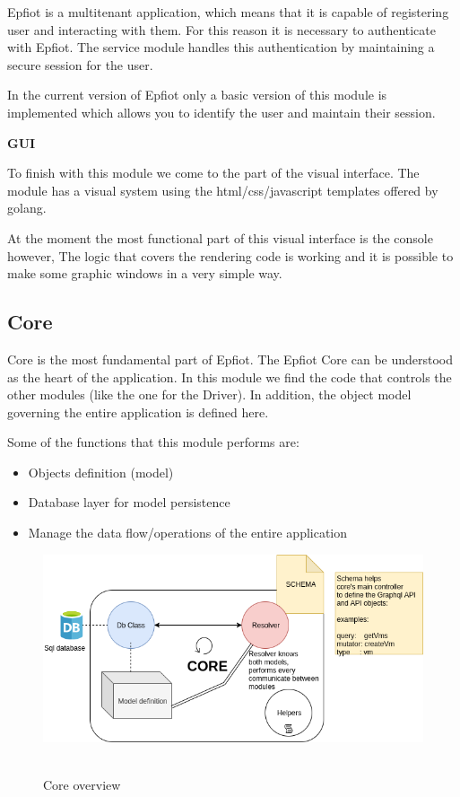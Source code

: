 Epfiot is a multitenant application, which means that it is capable of registering user and interacting with them. For this reason it is necessary to authenticate with Epfiot. 
The service module handles this authentication by maintaining a secure session for the user.

In the current version of Epfiot only a basic version of this module is implemented which allows you to identify the user and maintain their session.

\textbf{GUI}

To finish with this module we come to the part of the visual interface. The module has a visual system using the html/css/javascript templates offered by golang.

At the moment the most functional part of this visual interface is the console however, The logic that covers the rendering code is working and it is possible to make some graphic windows in a very simple way.



\newpage
\subsection{Core}

Core is the most fundamental part of Epfiot. The Epfiot Core can be understood as the heart of the application. In this module we find the code that controls the other modules (like the one for the Driver). In addition, the object model governing the entire application is defined here.

Some of the functions that this module performs are:
\begin{itemize}
    \item Objects definition (model)
    \item Database layer for model persistence
    \item Manage the data flow/operations of the entire application
\end{itemize}

\begin{figure}[h!]%
\centering
    \includegraphics[width=5.5in]{figures/Core.png}
~\caption{Core overview}
\label{figure4.4}
\end{figure}

